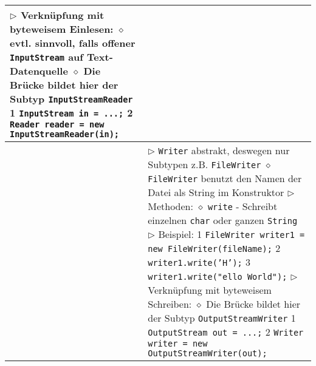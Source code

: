 \begin{longtable}{ | p{4cm} p{13.5cm} | }
{	$\rhd$ Verknüpfung mit byteweisem Einlesen: \\
	\hspace{0.4cm} $\diamond$ evtl. sinnvoll, falls offener \texttt{InputStream} auf Text-Datenquelle \\
	\hspace{0.4cm} $\diamond$ Die Brücke bildet hier der Subtyp \texttt{InputStreamReader} \\
	\hspace{0.4cm} 1 \hspace{0.1cm} \texttt{InputStream in = ...;} \\
	\hspace{0.4cm} 2 \hspace{0.1cm} \texttt{Reader reader = new InputStreamReader(in);}} \\ \hline

	\makecell[l]{Textdaten schreiben} & \makecell[l]{
	$\rhd$ \texttt{Writer} abstrakt, deswegen nur Subtypen z.B. \texttt{FileWriter} \\
	\hspace{0.4cm} $\diamond$ \texttt{FileWriter} benutzt den Namen der Datei als String im Konstruktor \\
	$\rhd$ Methoden: \\
	\hspace{0.4cm} $\diamond$ \texttt{write} \\
	\hspace{0.6cm} - Schreibt einzelnen \texttt{char} oder ganzen \texttt{String} \\
	$\rhd$ Beispiel: \\
	\hspace{0.4cm} 1 \hspace{0.1cm} \texttt{FileWriter writer1 = new FileWriter(fileName);} \\
	\hspace{0.4cm} 2 \hspace{0.1cm} \texttt{writer1.write('H');} \\
	\hspace{0.4cm} 3 \hspace{0.1cm} \texttt{writer1.write(\string"ello World\string");} \\ 
	$\rhd$ Verknüpfung mit byteweisem Schreiben: \\
	\hspace{0.4cm} $\diamond$ Die Brücke bildet hier der Subtyp \texttt{OutputStreamWriter} \\
	\hspace{0.4cm} 1 \hspace{0.1cm} \texttt{OutputStream out = ...;} \\
	\hspace{0.4cm} 2 \hspace{0.1cm} \texttt{Writer writer = new OutputStreamWriter(out);} } \\ \hline

	\end{longtable}

